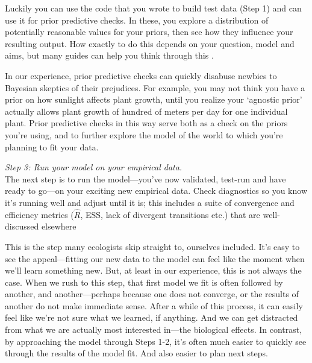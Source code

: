 \documentclass[11pt]{article}
\begin{document}
{Luckily you can use the code that you wrote to build test data (Step 1) and can use it for prior predictive checks. In these, you explore a distribution of potentially reasonable values for your priors, then see how they influence your resulting output. How exactly to do this depends on your question, model and aims, but many guides can help you think through this \citep{betanprior,wesner2021,winter2023}. 

In our experience, prior predictive checks can quickly disabuse newbies to Bayesian skeptics of their prejudices.  For example, you may not think you have a prior on how sunlight affects plant growth, until you realize your `agnostic prior' actually allows plant growth of hundred of meters per day for one individual plant. Prior predictive checks in this way serve both as a check on the priors you're using, and to further explore the model of the world to which you're planning to fit your data. %
 
 \emph{Step 3: Run your model on your empirical data.} \\
The next step is to run the model---you've now validated, test-run and have ready to go---on your exciting new empirical data. Check diagnostics so you know it's running well and adjust until it is; this includes a suite of convergence and efficiency metrics ($\hat{R}$, ESS, lack of divergent transitions etc.) that are well-discussed elsewhere \citep[][and not our focus here]{betanworkflow,gelman2020bayesian,vandeschoot2021,gabryvis}
 
This is the step many ecologists skip straight to, ourselves included. It's easy to see the appeal---fitting our new data to the model can feel like the moment when we'll learn something new. But, at least in our experience, this is not always the case. When we rush to this step, that first model we fit is often followed by another, and another---perhaps because one does not converge, or the results of another do not make immediate sense. After a while of this process, it can easily feel like we're not sure what we learned, if anything. And we can get distracted from what we are actually most interested in---the biological effects. In contrast, by approaching the model through Steps 1-2, it's often much easier to quickly see through the results of the model fit. And also easier to plan next steps. 
 

}
\end{document}

